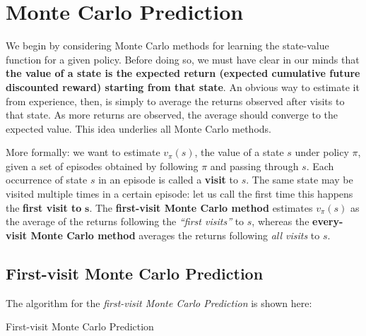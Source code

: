 \section{Monte Carlo Prediction}
We begin by considering Monte Carlo methods for learning the state-value function for a given policy. Before doing so, we must have clear in our minds that \textbf{the value of a state is the expected return (expected cumulative future discounted reward) starting from that state}. An obvious way to estimate it from experience, then, is simply to average the returns observed after visits to that state. As more returns are observed, the average should converge to the expected value. This idea underlies all Monte Carlo methods.

More formally: we want to estimate $v_\pi (s)$, the value of a state $s$ under policy $\pi$, given a set of episodes obtained by following $\pi$ and passing through $s$. Each occurrence of state $s$ in an episode is called a \textbf{visit} to $s$. The same state may be visited multiple times in a certain episode: let us call the first time this happens the \textbf{first visit to} $\boldsymbol{s}$. The \textbf{first-visit Monte Carlo method} estimates $v_\pi (s)$ as the average of the returns following the \textit{``first visits''} to $s$, whereas the \textbf{every-visit Monte Carlo method} averages the returns following \textit{all visits} to $s$.

\subsection{First-visit Monte Carlo Prediction}
The algorithm for the \textit{first-visit Monte Carlo Prediction} is shown here:

\begin{algorithm}[H]
\DontPrintSemicolon
\SetAlgoVlined
{}

 \caption{First-visit Monte Carlo Prediction}
\end{algorithm}

